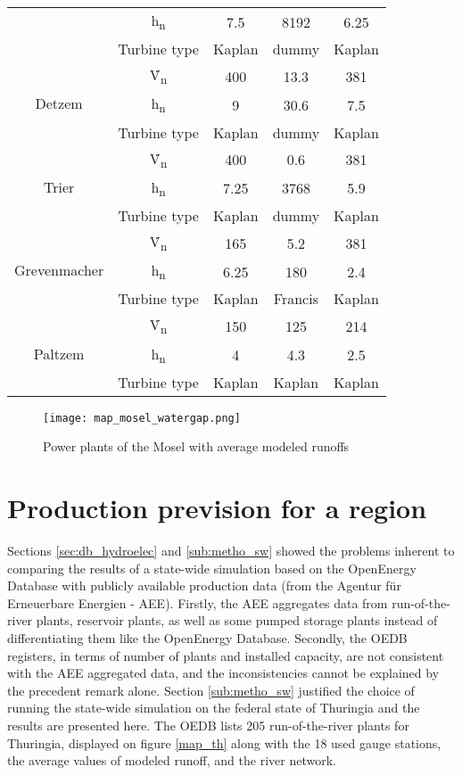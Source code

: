 \begin{longtable}{|c|c|c|c|c|}
  &h\textsubscript{n}&7.5&8192&6.25\\
  &Turbine type&Kaplan&dummy&Kaplan\\
  \hline
  \multirow{3}{*}{Detzem}&\.V\textsubscript{n}&400&13.3&381\\
  &h\textsubscript{n}&9&30.6&7.5\\
  &Turbine type&Kaplan&dummy&Kaplan\\
  \hline
  \multirow{3}{*}{Trier}&\.V\textsubscript{n}&400&0.6&381\\
  &h\textsubscript{n}&7.25&3768&5.9\\
  &Turbine type&Kaplan&dummy&Kaplan\\
  \hline
  \multirow{3}{*}{Grevenmacher}&\.V\textsubscript{n}&165&5.2&381\\
  &h\textsubscript{n}&6.25&180&2.4\\
  &Turbine type&Kaplan&Francis&Kaplan\\
  \hline
  \multirow{3}{*}{Paltzem}&\.V\textsubscript{n}&150&125&214\\
  &h\textsubscript{n}&4&4.3&2.5\\
  &Turbine type&Kaplan&Kaplan&Kaplan\\
\end{longtable}
\endgroup

\begin{figure}[H]
\centering
\texttt{[image: map\_mosel\_watergap.png]}
\caption{Power plants of the Mosel with average modeled runoffs}
\label{map_mosel_watergap}
\end{figure}

\section{Production prevision for a region}
\label{sec:res_th}

Sections \ref{sec:db_hydroelec} and \ref{sub:metho_sw} showed the problems inherent to comparing the results of a state-wide simulation based on the OpenEnergy Database with publicly available production data (from the Agentur für Erneuerbare Energien - AEE). Firstly, the AEE aggregates data from run-of-the-river plants, reservoir plants, as well as some pumped storage plants instead of differentiating them like the OpenEnergy Database. Secondly, the OEDB registers, in terms of number of plants and installed capacity, are not consistent with the AEE aggregated data, and the inconsistencies cannot be explained by the precedent remark alone. \newline
Section \ref{sub:metho_sw} justified the choice of running the state-wide simulation on the federal state of Thuringia and the results are presented here. \newline
The OEDB lists 205 run-of-the-river plants for Thuringia, displayed on figure \ref{map_th} along with the 18 used gauge stations, the average values of modeled runoff, and the river network.

